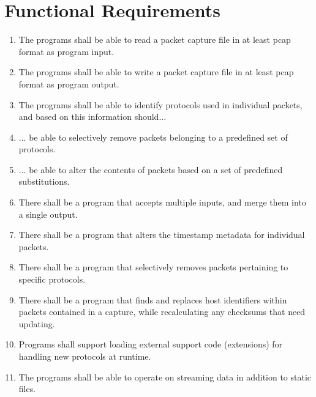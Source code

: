 \documentclass[10pt,a4paper,notitlepage]{report}
\begin{document}
\section{Functional Requirements}

\begin{enumerate}[label=\bfseries FR\arabic*:]
\item \label{fr:1} The programs shall be able to read a packet capture file in at least pcap format as program input.
\item \label{fr:2} The programs shall be able to write a packet capture file in at least pcap format as program output.
\item \label{fr:3} The programs shall be able to identify protocols used in individual packets, and based on this information should...
\item \label{fr:4} ... be able to selectively remove packets belonging to a predefined set of protocols.
\item \label{fr:5} ... be able to alter the contents of packets based on a set of predefined substitutions.
\item \label{fr:6} There shall be a program that accepts multiple inputs, and merge them into a single output.
\item \label{fr:7} There shall be a program that alters the timestamp metadata for individual packets.
\item \label{fr:8} There shall be a program that selectively removes packets pertaining to specific protocols.
\item \label{fr:9} There shall be a program that finds and replaces host identifiers within packets contained in a capture, while recalculating any checksums that need updating.
\item \label{fr:10} Programs shall support loading external support code (extensions) for handling new protocols at runtime.
\item \label{fr:11} The programs shall be able to operate on streaming data in addition to static files.
\end{enumerate}

\pagebreak
\end{document}
